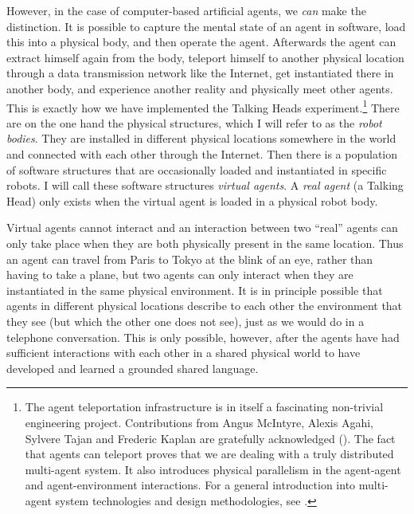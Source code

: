 \enlargethispage{1\baselineskip}

However, in the case of computer-based 
artificial agents, we {\itshape can} 
make the distinction. It is possible to capture the mental state
of an agent in software, load this into a physical 
body, and then operate 
the agent. Afterwards the agent can extract himself
again from the body, teleport himself 
to another physical location through a data transmission network
like the Internet, get instantiated there in another
body, and experience another reality and physically meet
other agents. This is exactly how we have implemented the 
Talking Heads experiment.\footnote{The agent teleportation infrastructure is in itself a 
fascinating non-trivial engineering project. Contributions 
from Angus McIntyre, Alexis Agahi, Sylvere Tajan and
Frederic Kaplan are gratefully acknowledged (\citealt{McIntyre:1999}). 
The fact that agents can teleport proves that we are dealing 
with a truly distributed multi-agent system. It also 
introduces physical parallelism in the agent-agent and 
agent-environment interactions. 
For a general introduction into multi-agent system
technologies and design methodologies, 
see \cite{Ferber:1999}.}
There are on the one hand
the physical structures, which I will refer to as the {\it
robot bodies}. They are installed in different physical 
locations somewhere in the world and connected
with each other through the Internet. Then there is 
a population of software structures that 
are occasionally loaded and instantiated in specific
robots. I will call these software structures
{\itshape virtual agents}. 
A {\itshape real agent} (a Talking Head) 
only exists when the virtual agent is
loaded in a physical robot body. 

Virtual agents cannot interact and 
an interaction between two ``real'' agents
can only take place when they are both physically present
in the same location. Thus an agent can travel from
Paris to Tokyo at the blink of an eye, rather than having
to take a plane, but two agents can only interact when they
are instantiated in the same physical environment. 
It is in principle possible that agents in different 
physical locations describe to each other the environment that they 
see (but which the other one does not see), just as we 
would do in a telephone conversation. This is only possible,
however, after the agents have had sufficient interactions
with each other in a shared physical world to have 
developed and learned a grounded shared language. 

